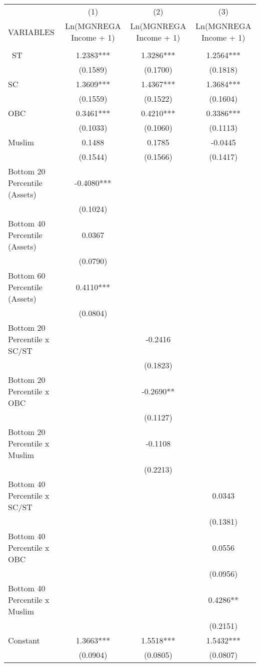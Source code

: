 \documentclass{article}
\begin{document}
\begin{landscape}
\begin{table}[]
\small
    \centering
    \begin{tabular}{lccc} \hline
 & (1) & (2) & (3) \\
VARIABLES & Ln(MGNREGA Income + 1) & Ln(MGNREGA Income + 1) & Ln(MGNREGA Income + 1) \\ \hline\hline
 &  &  &  \\\
ST & 1.2383*** & 1.3286*** & 1.2564*** \\
 & (0.1589) & (0.1700) & (0.1818) \\
SC & 1.3609*** & 1.4367*** & 1.3684*** \\
 & (0.1559) & (0.1522) & (0.1604) \\
OBC & 0.3461*** & 0.4210*** & 0.3386*** \\
 & (0.1033) & (0.1060) & (0.1113) \\
Muslim & 0.1488 & 0.1785 & -0.0445 \\
 & (0.1544) & (0.1566) & (0.1417) \\
Bottom 20 Percentile (Assets) & -0.4080*** &  &  \\
 & (0.1024) &  &  \\
Bottom 40 Percentile (Assets) & 0.0367 &  &  \\
 & (0.0790) &  &  \\
Bottom 60 Percentile (Assets) & 0.4110*** &  &  \\
 & (0.0804) &  &  \\
Bottom 20 Percentile x SC/ST &  & -0.2416 &  \\
 &  & (0.1823) &  \\
Bottom 20 Percentile x OBC &  & -0.2690** &  \\
 &  & (0.1127) &  \\
Bottom 20 Percentile x Muslim &  & -0.1108 &  \\
 &  & (0.2213) &  \\
Bottom 40 Percentile x SC/ST &  &  & 0.0343 \\
 &  &  & (0.1381) \\
Bottom 40 Percentile x OBC &  &  & 0.0556 \\
 &  &  & (0.0956) \\
Bottom 40 Percentile x Muslim &  &  & 0.4286** \\
 &  &  & (0.2151) \\
Constant & 1.3663*** & 1.5518*** & 1.5432*** \\
 & (0.0904) & (0.0805) & (0.0807) \\

\end{tabular}
\end{table}
\end{landscape}
\end{document}

